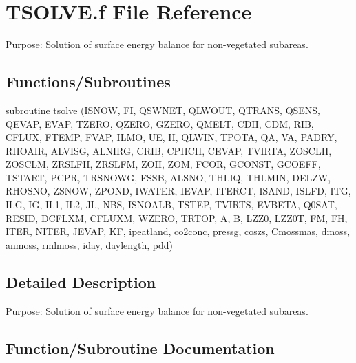 \hypertarget{TSOLVE_8f}{}\section{T\+S\+O\+L\+V\+E.\+f File Reference}
\label{TSOLVE_8f}


Purpose\+: Solution of surface energy balance for non-\/vegetated subareas.  


\subsection*{Functions/\+Subroutines}
\begin{DoxyCompactItemize}
\item 
subroutine \hyperlink{TSOLVE_8f_a6e73723f0d6d00d8dc1c69c462493fe2}{tsolve} (I\+S\+N\+O\+W, F\+I, Q\+S\+W\+N\+E\+T, Q\+L\+W\+O\+U\+T, Q\+T\+R\+A\+N\+S, Q\+S\+E\+N\+S, Q\+E\+V\+A\+P, E\+V\+A\+P, T\+Z\+E\+R\+O, Q\+Z\+E\+R\+O, G\+Z\+E\+R\+O, Q\+M\+E\+L\+T, C\+D\+H, C\+D\+M, R\+I\+B, C\+F\+L\+U\+X, F\+T\+E\+M\+P, F\+V\+A\+P, I\+L\+M\+O, U\+E, H, Q\+L\+W\+I\+N, T\+P\+O\+T\+A, Q\+A, V\+A, P\+A\+D\+R\+Y, R\+H\+O\+A\+I\+R, A\+L\+V\+I\+S\+G, A\+L\+N\+I\+R\+G, C\+R\+I\+B, C\+P\+H\+C\+H, C\+E\+V\+A\+P, T\+V\+I\+R\+T\+A, Z\+O\+S\+C\+L\+H, Z\+O\+S\+C\+L\+M, Z\+R\+S\+L\+F\+H, Z\+R\+S\+L\+F\+M, Z\+O\+H, Z\+O\+M, F\+C\+O\+R, G\+C\+O\+N\+S\+T, G\+C\+O\+E\+F\+F, T\+S\+T\+A\+R\+T, P\+C\+P\+R, T\+R\+S\+N\+O\+W\+G, F\+S\+S\+B, A\+L\+S\+N\+O, T\+H\+L\+I\+Q, T\+H\+L\+M\+I\+N, D\+E\+L\+Z\+W, R\+H\+O\+S\+N\+O, Z\+S\+N\+O\+W, Z\+P\+O\+N\+D, I\+W\+A\+T\+E\+R, I\+E\+V\+A\+P, I\+T\+E\+R\+C\+T, I\+S\+A\+N\+D, I\+S\+L\+F\+D, I\+T\+G, I\+L\+G, I\+G, I\+L1, I\+L2, J\+L, N\+B\+S, I\+S\+N\+O\+A\+L\+B, T\+S\+T\+E\+P, T\+V\+I\+R\+T\+S, E\+V\+B\+E\+T\+A, Q0\+S\+A\+T, R\+E\+S\+I\+D, D\+C\+F\+L\+X\+M, C\+F\+L\+U\+X\+M, W\+Z\+E\+R\+O, T\+R\+T\+O\+P, A, B, L\+Z\+Z0, L\+Z\+Z0\+T, F\+M, F\+H, I\+T\+E\+R, N\+I\+T\+E\+R, J\+E\+V\+A\+P, K\+F, ipeatland, co2conc, pressg, coszs, Cmossmas, dmoss, anmoss, rmlmoss, iday, daylength, pdd)
\end{DoxyCompactItemize}


\subsection{Detailed Description}
Purpose\+: Solution of surface energy balance for non-\/vegetated subareas. 



\subsection{Function/\+Subroutine Documentation}
\hypertarget{TSOLVE_8f_a6e73723f0d6d00d8dc1c69c462493fe2}{}

